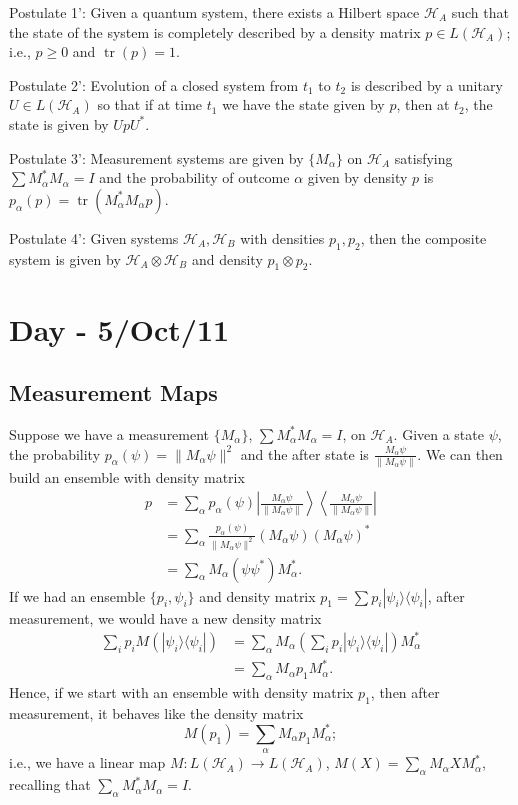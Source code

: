 \documentclass[12pt]{article}
\theoremstyle{definition}
\newcommand{\ketbra}[2]{|#1\rangle\langle #2|}
\DeclareMathOperator{\tr}{tr}
\begin{document}
Postulate 1': Given a quantum system, there exists a Hilbert space $\mathcal{H}_A$ such that the state of the system is completely described by a density matrix $p \in L(\mathcal{H}_A)$; i.e., $p \geq 0$ and $\tr(p)=1$.

Postulate 2': Evolution of a closed system from $t_1$ to $t_2$ is described by a unitary $U \in L(\mathcal{H}_A)$ so that if at time $t_1$ we have the state given by $p$, then at $t_2$, the state is given by $UpU^*$.

Postulate 3': Measurement systems are given by $\{M_\alpha\}$ on $\mathcal{H}_A$ satisfying $\sum M_\alpha^*M_\alpha = I$ and the probability of outcome $\alpha$ given by density $p$ is $p_\alpha(p)=\tr(M_\alpha^*M_\alpha p)$.

Postulate 4': Given systems $\mathcal{H}_A,\mathcal{H}_B$ with densities $p_1,p_2$, then the composite system is given by $\mathcal{H}_A \otimes \mathcal{H}_B$ and density $p_1 \otimes p_2$.

\section{Day - 5/Oct/11}

\subsection{Measurement Maps}

Suppose we have a measurement $\{M_\alpha\}$, $\sum M_\alpha^*M_\alpha=I$, on $\mathcal{H}_A$. Given a state $\psi$, the probability $p_\alpha(\psi)=\|M_\alpha\psi\|^2$ and the after state is $\frac{M_\alpha\psi}{\|M_\alpha\psi\|}$. We can then build an ensemble with density matrix
\begin{align*}
p &= \sum_\alpha p_\alpha(\psi) \left|\frac{M_\alpha\psi}{\|M_\alpha\psi\|}\right\rangle\left\langle\frac{M_\alpha\psi}{\|M_\alpha\psi\|}\right| \\
&= \sum_\alpha \frac{p_\alpha(\psi)}{\|M_\alpha\psi\|^2}(M_\alpha\psi)(M_\alpha\psi)^* \\
&= \sum_\alpha M_\alpha(\psi\psi^*)M_\alpha^*.
\end{align*}
If we had an ensemble $\{p_i,\psi_i\}$ and density matrix $p_1 = \sum p_i \ketbra{\psi_i}{\psi_i}$, after measurement, we would have a new density matrix
\begin{align*}
\sum_i p_i M(\ketbra{\psi_i}{\psi_i}) &= \sum_\alpha M_\alpha\left(\sum_i p_i \ketbra{\psi_i}{\psi_i}\right)M_\alpha^* \\
&= \sum_\alpha M_\alpha p_1 M_\alpha^*.
\end{align*}
Hence, if we start with an ensemble with density matrix $p_1$, then after measurement, it behaves like the density matrix
\[
M(p_1)=\sum_\alpha M_\alpha p_1 M_\alpha^*;
\]
i.e., we have a linear map $M:L(\mathcal{H}_A) \to L(\mathcal{H}_A)$, $M(X)=\sum_\alpha M_\alpha XM_\alpha^*$, recalling that $\sum_\alpha M_\alpha^*M_\alpha=I$.
\end{document}
